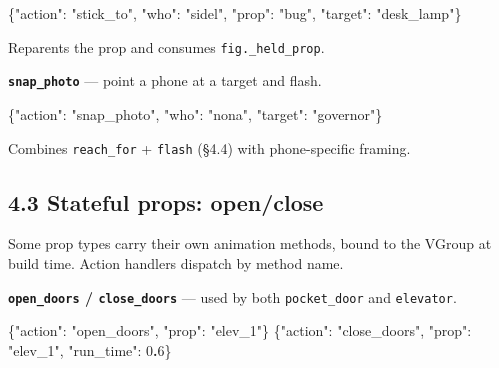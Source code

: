 \documentclass[
  12pt,
  letterpaper,
]{book}
\newenvironment{Shaded}{}{}
\newcommand{\DataTypeTok}[1]{\textcolor[rgb]{0.56,0.13,0.00}{#1}}
\newcommand{\DecValTok}[1]{\textcolor[rgb]{0.25,0.63,0.44}{#1}}
\newcommand{\ErrorTok}[1]{\textcolor[rgb]{1.00,0.00,0.00}{\textbf{#1}}}
\newcommand{\FunctionTok}[1]{\textcolor[rgb]{0.02,0.16,0.49}{#1}}
\newcommand{\StringTok}[1]{\textcolor[rgb]{0.25,0.44,0.63}{#1}}
\begin{document}
\begin{Shaded}
\begin{Highlighting}[]
\FunctionTok{\{}\DataTypeTok{"action"}\FunctionTok{:} \StringTok{"stick\_to"}\FunctionTok{,} \DataTypeTok{"who"}\FunctionTok{:} \StringTok{"sidel"}\FunctionTok{,}
 \DataTypeTok{"prop"}\FunctionTok{:} \StringTok{"bug"}\FunctionTok{,} \DataTypeTok{"target"}\FunctionTok{:} \StringTok{"desk\_lamp"}\FunctionTok{\}}
\end{Highlighting}
\end{Shaded}

Reparents the prop and consumes \texttt{fig.\_held\_prop}.

\textbf{\texttt{snap\_photo}} --- point a phone at a target and flash.

\begin{Shaded}
\begin{Highlighting}[]
\FunctionTok{\{}\DataTypeTok{"action"}\FunctionTok{:} \StringTok{"snap\_photo"}\FunctionTok{,} \DataTypeTok{"who"}\FunctionTok{:} \StringTok{"nona"}\FunctionTok{,} \DataTypeTok{"target"}\FunctionTok{:} \StringTok{"governor"}\FunctionTok{\}}
\end{Highlighting}
\end{Shaded}

Combines \texttt{reach\_for} + \texttt{flash} (§4.4) with phone-specific
framing.

\subsection{4.3 Stateful props:
open/close}\label{stateful-props-openclose}

Some prop types carry their own animation methods, bound to the VGroup
at build time. Action handlers dispatch by method name.

\textbf{\texttt{open\_doors} / \texttt{close\_doors}} --- used by both
\texttt{pocket\_door} and \texttt{elevator}.

\begin{Shaded}
\begin{Highlighting}[]
\FunctionTok{\{}\DataTypeTok{"action"}\FunctionTok{:} \StringTok{"open\_doors"}\FunctionTok{,} \DataTypeTok{"prop"}\FunctionTok{:} \StringTok{"elev\_1"}\FunctionTok{\}}
\FunctionTok{\{}\DataTypeTok{"action"}\FunctionTok{:} \StringTok{"close\_doors"}\FunctionTok{,} \DataTypeTok{"prop"}\FunctionTok{:} \StringTok{"elev\_1"}\FunctionTok{,} \DataTypeTok{"run\_time"}\FunctionTok{:} \DecValTok{0}\ErrorTok{.}\DecValTok{6}\FunctionTok{\}}
\end{Highlighting}
\end{Shaded}
\end{document}
